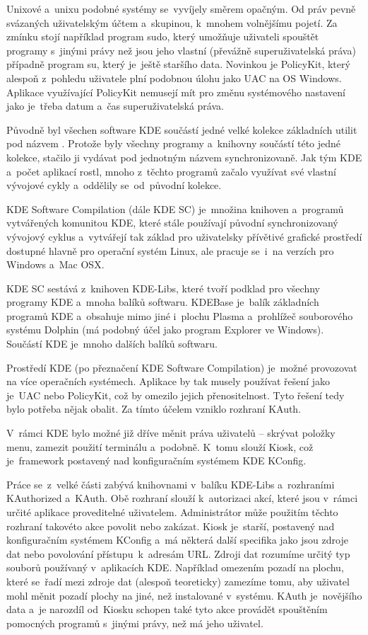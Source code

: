 Unixové a~unixu podobné systémy se~vyvíjely směrem opačným. Od práv pevně svázaných uživatelským účtem a~skupinou, k~mnohem volnějšímu pojetí. Za zmínku stojí například program sudo, který umožňuje uživateli spouštět programy s~jinými právy než jsou jeho vlastní (převážně superuživatelská práva) případně program su, který je~ještě staršího data. Novinkou je PolicyKit, který alespoň z~pohledu uživatele plní podobnou úlohu jako UAC na OS Windows. Aplikace využívající PolicyKit nemusejí mít pro změnu systémového nastavení jako je~třeba datum a~čas superuživatelská práva.


Původně byl všechen software KDE součástí jedné velké kolekce základních utilit pod názvem . Protože byly všechny programy a~knihovny součástí této jedné kolekce, stačilo ji vydávat pod jednotným názvem synchronizovaně. Jak tým KDE a~počet aplikací rostl, mnoho z~těchto programů začalo využívat své vlastní vývojové cykly a~oddělily se~od~původní kolekce.

KDE Software Compilation (dále KDE SC) je~množina knihoven a~programů vytvářených komunitou KDE, které stále používají původní synchronizovaný vývojový cyklus a~vytvářejí tak základ pro uživatelsky přívětivé grafické prostředí dostupné hlavně pro operační systém Linux, ale pracuje se~i~na verzích pro Windows a~Mac OSX.

KDE SC sestává z~knihoven KDE-Libs, které tvoří podklad pro všechny programy KDE a~mnoha balíků softwaru. KDEBase je~balík základních programů KDE a~obsahuje mimo jiné i~plochu Plasma a~prohlížeč souborového systému Dolphin (má podobný účel jako program Explorer ve Windows). Součástí KDE je~mnoho dalších balíků softwaru.

Prostředí KDE (po přeznačení KDE Software Compilation) je~možné provozovat na více operačních systémech. Aplikace by tak musely používat řešení jako je~UAC nebo PolicyKit, což by omezilo jejich přenositelnost. Tyto řešení tedy bylo potřeba nějak obalit. Za tímto účelem vzniklo rozhraní KAuth.\cite{whatiskde}


V~rámci KDE bylo možné již dříve měnit práva uživatelů -- skrývat položky menu, zamezit použití terminálu a~podobně. K~tomu slouží Kiosk, což je~framework postavený nad konfiguračním systémem KDE KConfig.

Práce se~z~velké části zabývá knihovnami v~balíku KDE-Libs a~rozhraními KAuthorized a~KAuth. Obě rozhraní slouží k~autorizaci akcí, které jsou v~rámci určité aplikace proveditelné uživatelem. Administrátor může použitím těchto rozhraní takovéto akce povolit nebo zakázat. Kiosk je~starší, postavený nad konfiguračním systémem KConfig a~má některá další specifika jako jsou zdroje dat nebo povolování přístupu~k~adresám URL. Zdroji dat rozumíme určitý typ souborů používaný v~aplikacích KDE. Například omezením pozadí na plochu, které se~řadí mezi zdroje dat (alespoň teoreticky) zamezíme tomu, aby uživatel mohl měnit pozadí plochy na jiné, než instalované v~systému. KAuth je~novějšího data a~je narozdíl od~Kiosku schopen také tyto akce provádět spouštěním pomocných programů s~jinými právy, než má jeho uživatel.

